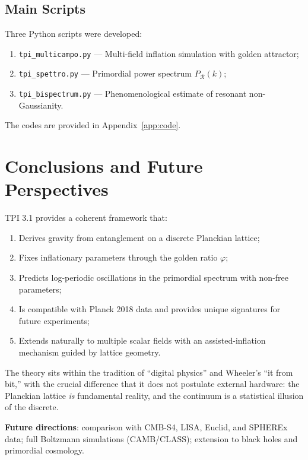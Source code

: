 \documentclass[11pt,a4paper]{article}
\theoremstyle{definition}
\begin{document}
\subsection{Main Scripts}

Three Python scripts were developed:
\begin{enumerate}
    \item \texttt{tpi\_multicampo.py} --- Multi-field inflation simulation with golden attractor;
    \item \texttt{tpi\_spettro.py} --- Primordial power spectrum $P_{\mathcal{R}}(k)$;
    \item \texttt{tpi\_bispectrum.py} --- Phenomenological estimate of resonant non-Gaussianity.
\end{enumerate}

The codes are provided in Appendix~\ref{app:code}.

\section{Conclusions and Future Perspectives}\label{sec:conclusions}

TPI 3.1 provides a coherent framework that:
\begin{enumerate}
    \item Derives gravity from entanglement on a discrete Planckian lattice;
    \item Fixes inflationary parameters through the golden ratio $\varphi$;
    \item Predicts log-periodic oscillations in the primordial spectrum with non-free parameters;
    \item Is compatible with Planck 2018 data and provides unique signatures for future experiments;
    \item Extends naturally to multiple scalar fields with an assisted-inflation mechanism guided by lattice geometry.
\end{enumerate}

The theory sits within the tradition of ``digital physics'' and Wheeler's ``it from bit,'' with the crucial difference that it does not postulate external hardware: the Planckian lattice \textit{is} fundamental reality, and the continuum is a statistical illusion of the discrete.

\textbf{Future directions}: comparison with CMB-S4, LISA, Euclid, and SPHEREx data; full Boltzmann simulations (CAMB/CLASS); extension to black holes and primordial cosmology.
\end{document}
